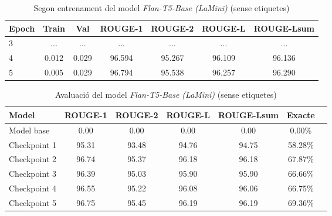 \begin{table}[H]
    \centering
    \begin{tabular}{lcccccc}
    \toprule
    Epoch & Train & Val & ROUGE-1 & ROUGE-2 & ROUGE-L & ROUGE-Lsum \\
    \midrule
    3 & ...  & ...    & ...    & ...    & ...    & ... \\
    4 & 0.012 & 0.029 & 96.594 & 95.267 & 96.109 & 96.136 \\
    5 & 0.005 & 0.029 & 96.794 & 95.538 & 96.257 & 96.290 \\
    \bottomrule
    \end{tabular}
    \caption[Segon entrenament del model \textit{Flan-T5-Base (LaMini)}]{Segon entrenament del model \textit{Flan-T5-Base (LaMini)} (sense etiquetes)}
\end{table}

\begin{table}[H]
    \centering
    \begin{tabular}{lcccccc}
    \toprule
    Model & ROUGE-1 & ROUGE-2 & ROUGE-L & ROUGE-Lsum & Exacte \\
    \midrule
    Model base   & 0.00  & 0.00  & 0.00  & 0.00  & 0.00\% \\
    Checkpoint 1 & 95.31 & 93.48 & 94.76 & 94.75 & 58.28\% \\
    Checkpoint 2 & 96.74 & 95.37 & 96.18 & 96.18 & 67.87\% \\
    Checkpoint 3 & 96.39 & 95.03 & 95.90 & 95.90 & 66.66\% \\
    Checkpoint 4 & 96.55 & 95.22 & 96.08 & 96.06 & 66.75\% \\
    Checkpoint 5 & 96.75 & 95.45 & 96.19 & 96.19 & 69.36\% \\
    \bottomrule
    \end{tabular}
    \caption[Avaluació del model \textit{Flan-T5-Base (LaMini)}]{Avaluació del model \textit{Flan-T5-Base (LaMini)} (sense etiquetes)}
\end{table}






